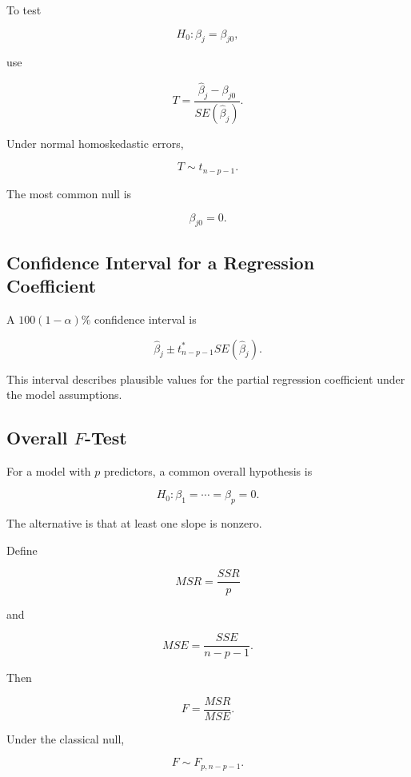 To test

\[
H_0:
\beta_j=\beta_{j0},
\]

use

\[
\boxed{
T
=
\frac{
\widehat{\beta}_j-\beta_{j0}
}{
SE(\widehat{\beta}_j)
}.
}
\]

Under normal homoskedastic errors,

\[
\boxed{
T
\sim
t_{n-p-1}.
}
\]

The most common null is

\[
\beta_{j0}=0.
\]

\subsection{Confidence Interval for a Regression Coefficient}
\label{subsec:ci-regression-coefficient}

A \(100(1-\alpha)\%\) confidence interval is

\[
\boxed{
\widehat{\beta}_j
\pm
t^*_{n-p-1}
SE(\widehat{\beta}_j).
}
\]

This interval describes plausible values for the partial regression
coefficient under the model assumptions.

\subsection{Overall \(F\)-Test}
\label{subsec:overall-f-test-regression}

For a model with \(p\) predictors, a common overall hypothesis is

\[
\boxed{
H_0:
\beta_1
=
\cdots
=
\beta_p
=
0.
}
\]

The alternative is that at least one slope is nonzero.

Define

\[
MSR
=
\frac{
SSR
}{p}
\]

and

\[
MSE
=
\frac{
SSE
}{
n-p-1
}.
\]

Then

\[
\boxed{
F
=
\frac{
MSR
}{
MSE
}.
}
\]

Under the classical null,

\[
\boxed{
F
\sim
F_{p,n-p-1}.
}
\]


